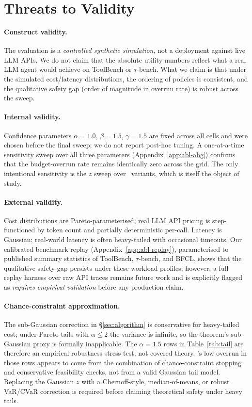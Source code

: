\section{Threats to Validity}
\label{sec:threats}

\paragraph{Construct validity.}
The evaluation is a \emph{controlled synthetic simulation}, not a
deployment against live LLM APIs. We do not claim that the absolute
utility numbers reflect what a real LLM agent would achieve on
ToolBench or $\tau$-bench. What we claim is that under the simulated
cost/latency distributions, the ordering of policies is consistent,
and the qualitative safety gap (order of magnitude in overrun rate) is
robust across the sweep.

\paragraph{Internal validity.}
Confidence parameters $\alpha = 1.0$, $\beta = 1.5$, $\gamma = 1.5$
are fixed across all cells and were chosen before the final sweep; we
do not report post-hoc tuning. A one-at-a-time sensitivity sweep over
all three parameters (Appendix~\ref{app:abl-abg}) confirms that the
budget-overrun rate remains identically zero across the grid. The only
intentional sensitivity is the $z$ sweep over \CBUC~variants, which is
itself the object of study.

\paragraph{External validity.}
Cost distributions are Pareto-parameterised; real LLM API pricing is
step-functioned by token count and partially deterministic per-call.
Latency is Gaussian; real-world latency is often heavy-tailed with
occasional timeouts. Our calibrated benchmark replay
(Appendix~\ref{app:abl-replay}), parameterised to published summary
statistics of ToolBench, $\tau$-bench, and BFCL, shows that the
qualitative safety gap persists under these workload profiles;
however, a full replay harness over raw API traces remains future work
and is explicitly flagged as \emph{requires empirical validation}
before any production claim.

\paragraph{Chance-constraint approximation.}
The sub-Gaussian correction in \S\ref{sec:algorithm} is conservative
for heavy-tailed cost; under Pareto tails with $\alpha \le 2$ the
variance is infinite, so the theorem's sub-Gaussian proxy is formally
inapplicable. The $\alpha=1.5$ rows in Table~\ref{tab:tail} are
therefore an empirical robustness stress test, not covered theory.
\CBUC's low overrun in those rows appears to come from the combination
of chance-constraint stopping and conservative feasibility checks, not
from a valid Gaussian tail model. Replacing the Gaussian $z$ with a
Chernoff-style, median-of-means, or robust VaR/CVaR correction is
required before claiming theoretical safety under heavy tails.

